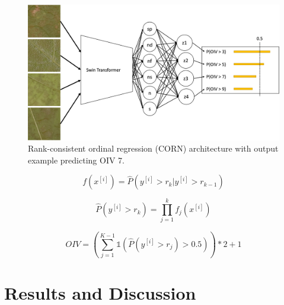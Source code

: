 \documentclass[english]{article}
\begin{document}




\begin{figure}[H]
    \centering
    \includegraphics[width=0.9\linewidth]{p_viticola/resources/images/2023_a_oiv_bin_corn.png}
    \caption{Rank-consistent ordinal regression (CORN) architecture with output example predicting OIV 7.}
    \label{fig:corn}
\end{figure}

\begin{equation}
    f(x^{[i]}) = \hat{P}(y^{[i]} > r_{k}|y^{[i]} > r_{k-1})\label{fml:binclass}
\end{equation}

\begin{equation}
    \hat{P}(y^{[i]} > r_{k}) = \prod_{j=1}^{k}f_{j}(x^{[i]})\label{fml:unconditionalprob}
\end{equation}

\begin{equation}
    OIV = (\sum_{j=1}^{K-1}\mathbb{1}(\hat{P}(y^{[i]} > r_{j}) > 0.5))*2 + 1\label{fml:rankprob}
\end{equation}

\section{Results and Discussion}
\end{document}
